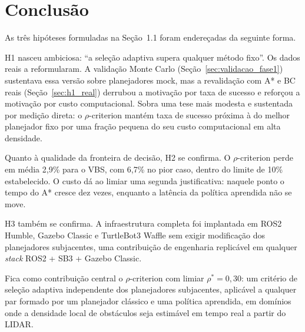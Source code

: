 \documentclass[12pt, a4paper]{article}
\begin{document}
\section{Conclusão}

As três hipóteses formuladas na Seção~1.1 foram endereçadas da seguinte forma.

H1 nasceu ambiciosa: ``a seleção adaptiva supera qualquer método fixo''. Os dados reais a
reformularam. A validação Monte Carlo (Seção~\ref{sec:validacao_fase1}) sustentava essa versão
sobre planejadores mock, mas a revalidação com A* e BC reais (Seção~\ref{sec:h1_real}) derrubou a
motivação por taxa de sucesso e reforçou a motivação por custo computacional. Sobra uma tese mais
modesta e sustentada por medição direta: o $\rho$-criterion mantém taxa de sucesso próxima à do
melhor planejador fixo por uma fração pequena do seu custo computacional em alta densidade.

Quanto à qualidade da fronteira de decisão, H2 se confirma. O $\rho$-criterion perde em média
2,9\% para o VBS, com 6,7\% no pior caso, dentro do limite de 10\% estabelecido. O custo dá ao
limiar uma segunda justificativa: naquele ponto o tempo do A* cresce dez vezes, enquanto a
latência da política aprendida não se move.

H3 também se confirma. A infraestrutura completa foi implantada em ROS2 Humble, Gazebo Classic e
TurtleBot3 Waffle sem exigir modificação dos planejadores subjacentes, uma contribuição de
engenharia replicável em qualquer \textit{stack} ROS2 + SB3 + Gazebo Classic.

Fica como contribuição central o $\rho$-criterion com limiar $\rho^*{=}0{,}30$: um critério de
seleção adaptiva independente dos planejadores subjacentes, aplicável a qualquer par formado por
um planejador clássico e uma política aprendida, em domínios onde a densidade local de obstáculos
seja estimável em tempo real a partir do LIDAR.
\end{document}
